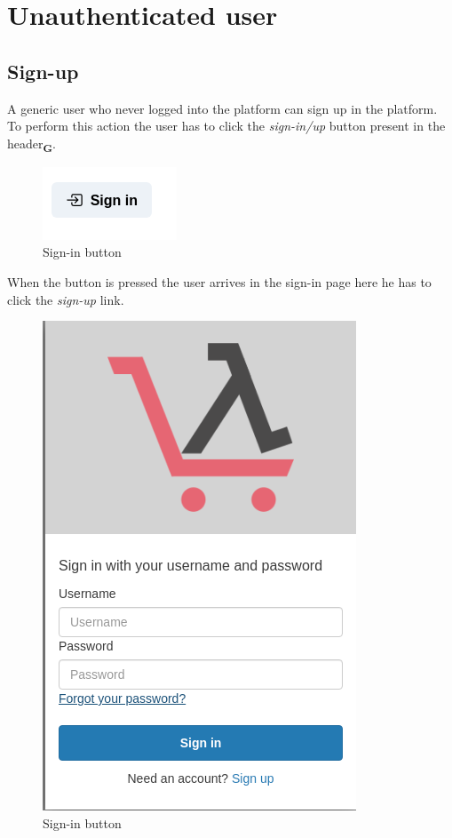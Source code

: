 \section{Unauthenticated user}
\subsection{Sign-up}
A generic user who never logged into the platform can sign up in the platform. To perform this action the user has to click the \textit{sign-in/up} button present in the header\textsubscript{\textbf{G}}.
\begin{figure}[!ht]
    \caption{Sign-in button}
    \vspace{10px}
    \includegraphics[scale=0.5]{../../../../Images/userManual/signInButton.png}
    \centering
\end{figure}
When the button is pressed the user arrives in the sign-in page here he has to click the \textit{sign-up} link.
\begin{figure}[!ht]
    \caption{Sign-in button}
    \vspace{10px}
    \includegraphics[scale=0.3]{../../../../Images/userManual/singIN.png}
    \centering
\end{figure}
